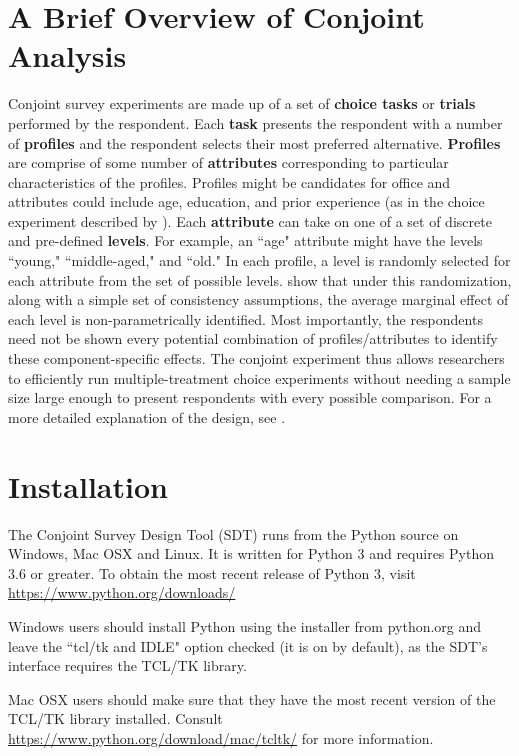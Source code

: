 \documentclass[12pt]{article}
\begin{document}
\section{A Brief Overview of Conjoint Analysis}

Conjoint survey experiments are made up of a set of  \textbf{choice tasks} or \textbf{trials} performed by the respondent. Each \textbf{task} presents the respondent with a number of \textbf{profiles} and the respondent selects their most preferred alternative. \textbf{Profiles} are comprise of some number of \textbf{attributes} corresponding to particular characteristics of the profiles. Profiles might be candidates for office and attributes could include age, education, and prior experience (as in the choice experiment described by \cite{hainmueller2013}). Each \textbf{attribute} can take on one of a set of discrete and pre-defined \textbf{levels}. For example, an ``age" attribute might have the levels ``young," ``middle-aged," and ``old." In each profile, a level is randomly selected for each attribute from the set of possible levels. \cite{hainmueller2013} show that under this randomization, along with a simple set of consistency assumptions, the average marginal effect of each level is non-parametrically identified. Most importantly, the respondents need not be shown every potential combination of profiles/attributes to identify these component-specific effects. The conjoint experiment thus allows researchers to efficiently run multiple-treatment choice experiments without needing a sample size large enough to present respondents with every possible comparison. For a more detailed explanation of the design, see \cite{hainmueller2013}.

\section{Installation}

The Conjoint Survey Design Tool (SDT) runs from the Python source on Windows, Mac OSX and Linux. It is written for Python 3 and requires Python 3.6 or greater. To obtain the most recent release of Python 3, visit \href{https://www.python.org/downloads/}{https://www.python.org/downloads/}

Windows users should install Python using the installer from python.org and leave the ``tcl/tk and IDLE" option checked (it is on by default), as the SDT's interface requires the TCL/TK library.

Mac OSX users should make sure that they have the most recent version of the TCL/TK library installed. Consult \href{https://www.python.org/download/mac/tcltk/}{https://www.python.org/download/mac/tcltk/} for more information.
\end{document}
